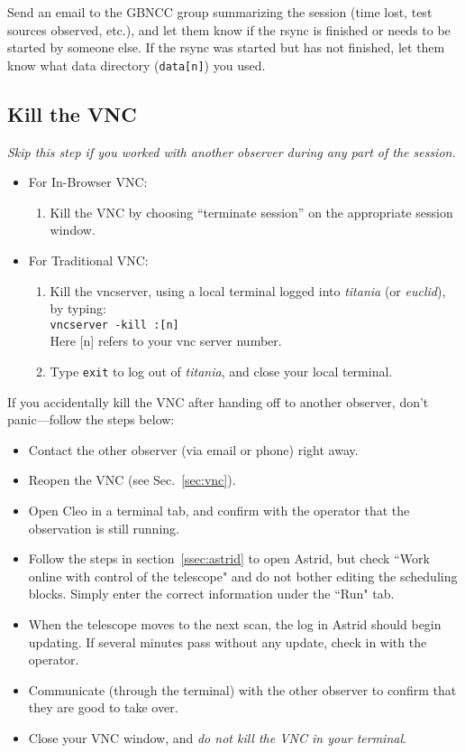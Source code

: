 \documentclass[11pt]{article}
\begin{document}
Send an email to the GBNCC group summarizing the session (time lost, test sources observed, etc.), and let them know if the rsync is finished or needs to be started by someone else.  If the rsync was started but has not finished, let them know what data directory (\texttt{data[n]}) you used.  


\subsection{Kill the VNC}\label{ssec:kill}  %
\textit{Skip this step if you worked with another observer during any part of the session.} \begin{itemize}
\item For In-Browser VNC:
 \begin{enumerate}
  \item Kill the VNC by choosing ``terminate session'' on the appropriate session window.
  \end{enumerate}
  \item For Traditional VNC:
  \begin{enumerate} 
\item  Kill the vncserver, using a local terminal logged into \textit{titania} (or \textit{euclid}), by typing: \\
\indent\texttt{vncserver -kill :[n]} \\
Here [n] refers to your vnc server number. \\
\item Type \texttt{exit} to log out of \textit{titania}, and close your local terminal. 
  \end{enumerate}
\end{itemize}

\noindent If you accidentally kill the VNC after handing off to another observer, don't panic---follow the steps below:  \begin{itemize}
 \item Contact the other observer (via email or phone) right away. 
 \item Reopen the VNC (see Sec.~\ref{sec:vnc}). 
 \item Open Cleo in a terminal tab, and confirm with the operator that the observation is still running. 
 \item Follow the steps in section~\ref{ssec:astrid} to open Astrid, but check ``Work online with control of the telescope" and do not bother editing the scheduling blocks.  Simply enter the correct information under the ``Run" tab.  
 \item When the telescope moves to the next scan, the log in Astrid should begin updating.  If several minutes pass without any update, check in with the operator. 
 \item Communicate (through the terminal) with the other observer to confirm that they are good to take over.  
 \item Close your VNC window, and \textit{do not kill the VNC in your terminal}.  
\end{itemize}
\end{document}
